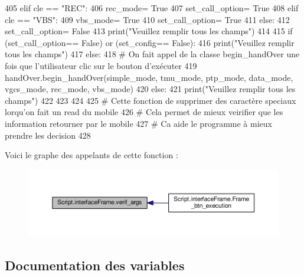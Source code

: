 \begin{DoxyCode}
405                 \textcolor{keywordflow}{elif} cle == \textcolor{stringliteral}{"REC"}:
406                     rec\_mode= \textcolor{keyword}{True}
407                     set\_call\_option= \textcolor{keyword}{True}
408                 \textcolor{keywordflow}{elif} cle == \textcolor{stringliteral}{"VBS"}:
409                     vbs\_mode= \textcolor{keyword}{True}
410                     set\_call\_option= \textcolor{keyword}{True}
411                 \textcolor{keywordflow}{else}:
412                     set\_call\_option= \textcolor{keyword}{False}
413                     print(\textcolor{stringliteral}{"Veuillez remplir tous les champs"})
414         
415         \textcolor{keywordflow}{if} (set\_call\_option== \textcolor{keyword}{False}) \textcolor{keywordflow}{or} (set\_config== \textcolor{keyword}{False}):
416             print(\textcolor{stringliteral}{"Veuillez remplir tous les champs"})
417         \textcolor{keywordflow}{else}:
418             \textcolor{comment}{# On fait appel de la classe begin\_handOver une fois que l'utilisateur clic sur le bouton
       d'exécuter
}
419             handOver.begin\_handOver(simple\_mode, tmu\_mode, ptp\_mode, data\_mode, vgcs\_mode, rec\_mode, 
      vbs\_mode)
420     \textcolor{keywordflow}{else}:
421         print(\textcolor{stringliteral}{"Veuillez remplir tous les champs"})
422 
423 
424 
425 \textcolor{comment}{# Cette fonction de supprimer des caractère speciaux lorqu'on fait un read du mobile
}
426 \textcolor{comment}{# Cela permet de mieux veirifier que les information retourner par le mobile
}
427 \textcolor{comment}{# Ca aide le programme à mieux prendre les decision 
}
428 
\end{DoxyCode}
Voici le graphe des appelants de cette fonction \+:\nopagebreak
\begin{figure}[H]
\begin{center}
\leavevmode
\includegraphics[width=350pt]{namespaceScript_1_1interfaceFrame_a7a90dd83e0b67edcf2dee870d927e98e_icgraph}
\end{center}
\end{figure}


\subsection{Documentation des variables}
\mbox{\label{namespaceScript_1_1interfaceFrame_ab8e385a4d6a1f87628b963bc0a385519}} 
